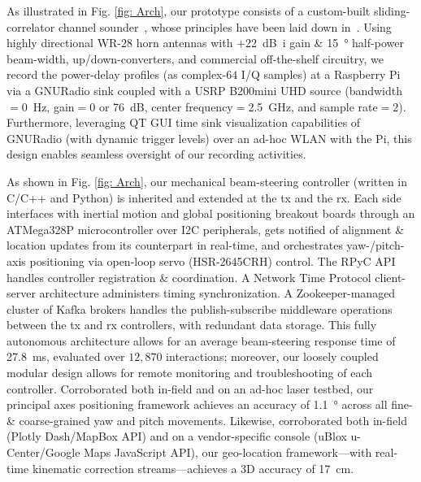\documentclass[10pt,twocolumn]{IEEEtran}
\begin{document}
\vspace{\extraspacebeforesubsubsec} As illustrated in Fig. \ref{fig: Arch}, our prototype consists of a custom-built sliding-correlator channel sounder~\cite{Purdue}, whose principles have been laid down in~\cite{Sounder}. Using highly directional WR-$28$ horn antennas with $+$\SI{22}{\deci\bel{i}} gain \& \SI{15}{\degree} half-power beam-width, up/down-converters, and commercial off-the-shelf circuitry, we record the power-delay profiles (as complex-$64$ I/Q samples) at a Raspberry Pi via a GNURadio sink coupled with a USRP B$200$mini UHD source (bandwidth${=}$\SI{0}{\hertz}, gain${=}$\num{0} or \SI{76}{\deci\bel}, center frequency${=}$\SI{2.5}{\giga\hertz}, and sample rate${=}$\SI{2}{}). Furthermore, leveraging QT GUI time sink visualization capabilities of GNURadio (with dynamic trigger levels) over an ad-hoc WLAN with the Pi, this design enables seamless oversight of our recording activities.

\vspace{\extraspacebeforesubsubsec} As shown in Fig. \ref{fig: Arch}, our mechanical beam-steering controller (written in C/C++ and Python) is inherited and extended at the \gls{tx} and the \gls{rx}. Each side interfaces with inertial motion and global positioning breakout boards through an ATMega328P microcontroller over I2C peripherals, gets notified of alignment \& location updates from its counterpart in real-time, and orchestrates yaw-/pitch-axis positioning via open-loop servo (HSR-2645CRH) control. The RPyC API handles controller registration \& coordination. A Network Time Protocol client-server architecture administers timing synchronization. A Zookeeper-managed cluster of Kafka brokers handles the publish-subscribe middleware operations between the \gls{tx} and \gls{rx} controllers, with redundant data storage. This fully autonomous architecture allows for an average beam-steering response time of \SI{27.8}{\milli\second}, evaluated over $12,870$ interactions; moreover, our loosely coupled modular design allows for remote monitoring and troubleshooting of each controller. Corroborated both in-field and on an ad-hoc laser testbed, our principal axes positioning framework achieves an accuracy of \SI{1.1}{\degree} across all fine- \& coarse-grained yaw and pitch movements. Likewise, corroborated both in-field (Plotly Dash/MapBox API) and on a vendor-specific console (uBlox u-Center/Google Maps JavaScript API), our geo-location framework---with real-time kinematic correction streams---achieves a $3$D accuracy of \SI{17}{\centi\meter}.
\end{document}
